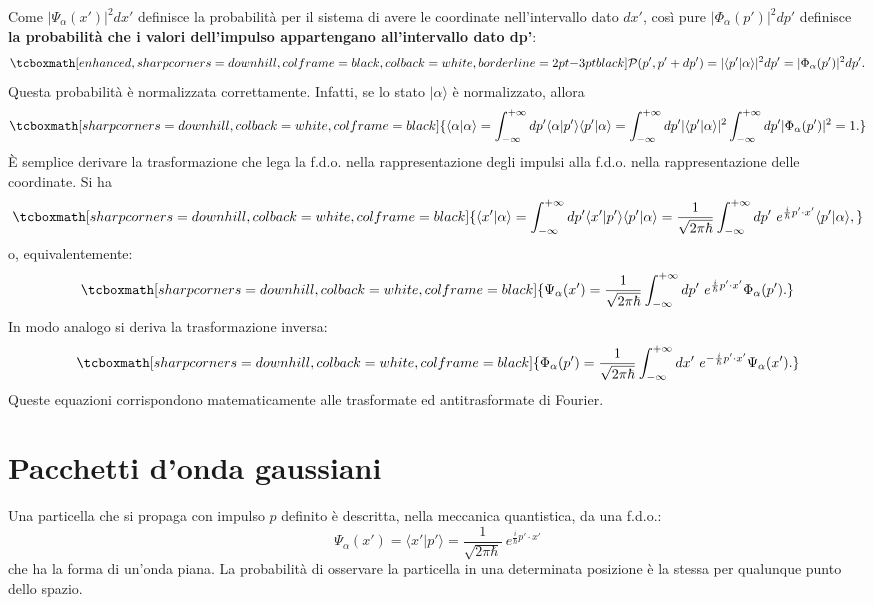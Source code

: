 Come $|\Psi_\alpha (x')|^2 dx'$ definisce la probabilità per il sistema di avere le coordinate nell'intervallo dato $dx'$, così pure $|\Phi_\alpha (p')|^2 dp'$ definisce \textbf{la probabilità che i valori dell'impulso appartengano all'intervallo dato dp'}:
	\begin{equation}
		\tcboxmath[enhanced, sharp corners=downhill, colframe=black, colback=white, borderline={2pt}{-3pt}{black}]{
			\mathcal{P}(p', p'+dp') = |\langle p' | \alpha \rangle|^2 dp' = |\Phi_\alpha (p')|^2 dp'.
			}
	\end{equation}
Questa probabilità è normalizzata correttamente. Infatti, se lo stato $| \alpha \rangle$ è normalizzato, allora
	\begin{equation}
		\tcboxmath[sharp corners=downhill, colback=white, colframe=black]{
			\langle \alpha | \alpha \rangle = \int_{-\infty}^{+\infty} dp' \langle \alpha | p' \rangle \langle p' | \alpha \rangle = \int_{-\infty}^{+\infty} dp' | \langle p' | \alpha \rangle |^2 \int_{-\infty}^{+\infty} dp' |\Phi_\alpha (p')|^2 = 1 .
			}
	\end{equation}
\`E semplice derivare la trasformazione che lega la f.d.o. nella rappresentazione degli impulsi alla f.d.o. nella rappresentazione delle coordinate. Si ha
	\begin{equation}
		\tcboxmath[sharp corners=downhill, colback=white, colframe=black]{
			\langle x' | \alpha \rangle = \int_{-\infty}^{+\infty} dp' \langle x' | p' \rangle \langle p' | \alpha \rangle =  \frac{1}{\sqrt{2 \pi \hbar}} \int_{-\infty}^{+\infty} dp' ~ e^{\frac{i}{\hbar}p' \cdot x'} \langle p' | \alpha \rangle ,
			}
	\end{equation}
o, equivalentemente:
	\begin{equation}
		\tcboxmath[sharp corners=downhill, colback=white, colframe=black]{
			\Psi_\alpha (x') = \frac{1}{\sqrt{2 \pi \hbar}} \int_{-\infty}^{+\infty} dp' ~ e^{\frac{i}{\hbar}p' \cdot x'} \Phi_\alpha (p').
			}
	\end{equation}
In modo analogo si deriva la trasformazione inversa:
	\begin{equation}
		\tcboxmath[sharp corners=downhill, colback=white, colframe=black]{
			\Phi_\alpha (p') = \frac{1}{\sqrt{2 \pi \hbar}} \int_{-\infty}^{+\infty} dx' ~ e^{-\frac{i}{\hbar}p' \cdot x'} \Psi_\alpha (x').
			}
	\end{equation}
Queste equazioni corrispondono matematicamente alle trasformate ed antitrasformate di Fourier.
\section[Pacchetti d'onda gaussiani]{Pacchetti d'onda gaussiani }
Una particella che si propaga con impulso $p$ definito è descritta, nella meccanica quantistica, da una f.d.o.:
	\begin{equation}
		\Psi_\alpha (x') = \langle x' | p' \rangle = \frac{1}{\sqrt{2 \pi \hbar}}~  e^{\frac{i}{\hbar}p' \cdot x'}
	\end{equation}
che ha la forma di un'onda piana. La probabilità di osservare la particella in una determinata posizione è la stessa per qualunque punto dello spazio.\\

